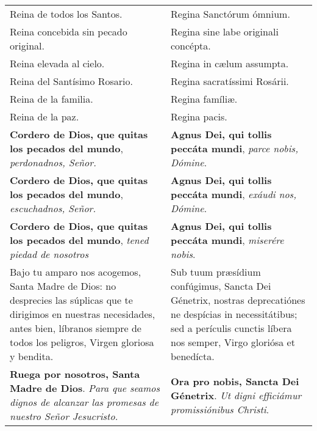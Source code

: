\documentclass[./devocionario.tex]{subfiles}
\begin{document}
\begin{longtable} { p{} p{} }
        Reina de todos los Santos. & Regina Sanctórum ómnium.\\
        Reina concebida sin pecado original. & Regina sine labe originali concépta.\\
        Reina elevada al cielo. & Regina in cælum assumpta.\\
        Reina del Santísimo Rosario. & Regina sa­cra­tíssimi Rosárii.\\
        Reina de la familia. & Regina famíliæ.\\
        Reina de la paz. & Regina pacis.\\
        \textbf{Cordero de Dios, que quitas los pecados del mundo}, \textit{perdonadnos, Señor.} 
        &
        \textbf{Agnus Dei, qui tollis peccáta mundi}, \textit{parce nobis, Dómine}.\\
        \textbf{Cordero de Dios, que quitas los pecados del mundo}, \textit{escuchadnos, Señor.}
        &
        \textbf{Agnus Dei, qui tollis peccáta mundi}, \textit{exáudi nos, Dómine}.\\
        \textbf{Cordero de Dios, que quitas los pecados del mundo}, \textit{tened piedad de nosotros}
        &
        \textbf{Agnus Dei, qui tollis peccáta mundi}, \textit{miserére nobis}.\\
        Bajo tu amparo nos acogemos, Santa Madre de Dios: no desprecies las súplicas que te dirigimos en nuestras necesidades, 
        antes bien, líbranos siempre de todos los peligros, Virgen gloriosa y bendita.
        &
        Sub tuum præsídium confúgimus, Sancta Dei Génetrix, nostras de­pre­ca­tiónes ne despícias in ne­ces­si­tátibus; 
        sed a perículis cunctis líbera nos semper, Virgo gloriósa et benedícta.\\
        \textbf{Ruega por nosotros, Santa Madre de Dios}. \textit{Para que seamos dignos de alcanzar las promesas de nuestro Señor Jesucristo.}
        &
        \textbf{Ora pro nobis, Sancta Dei Génetrix}. \textit{Ut digni efficiámur pro­mi­ssiónibus Christi}.
        
    \end{longtable}
\end{document}
